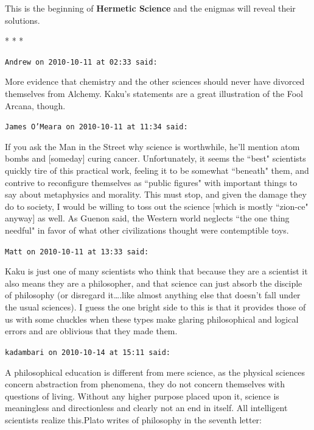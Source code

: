 This is the beginning of \textbf{Hermetic Science} and the enigmas will reveal their solutions.




\begin{center}* * *\end{center}

\begin{footnotesize}\begin{sffamily}



\texttt{Andrew on 2010-10-11 at 02:33 said: }

More evidence that chemistry and the other sciences should never have divorced themselves from Alchemy.
Kaku's statements are a great illustration of the Fool Arcana, though.


\hfill

\texttt{James O'Meara on 2010-10-11 at 11:34 said: }

If you ask the Man in the Street why science is worthwhile, he'll mention atom bombs and [someday]
curing cancer. Unfortunately, it seems the ``best" scientists quickly tire of this practical work, feeling it to be
somewhat ``beneath" them, and contrive to reconfigure themselves as ``public figures" with important things to say about
metaphysics and morality. This must stop, and given the damage they do to society, I would be willing to toss out the
science [which is mostly ``zion-ce" anyway] as well. As Guenon said, the Western world neglects ``the one thing needful"
in favor of what other civilizations thought were contemptible toys.


\hfill

\texttt{Matt on 2010-10-11 at 13:33 said: }

Kaku is just one of many scientists who think that because they are a scientist it also means they are a philosopher,
and that science can just absorb the disciple of philosophy (or disregard it….like almost anything else that
doesn't fall under the usual sciences). I guess the one bright side to this is that it provides
those of us with some chuckles when these types make glaring philosophical and logical errors and are oblivious that
they made them.


\hfill

\texttt{kadambari on 2010-10-14 at 15:11 said: }

A philosophical education is different from mere science, as the physical sciences concern abstraction from phenomena,
they do not concern themselves with questions of living. Without any higher purpose placed upon it, science is
meaningless and directionless and clearly not an end in itself. All intelligent scientists realize this.Plato writes of
philosophy in the seventh letter:


\end{sffamily}
\end{footnotesize}
